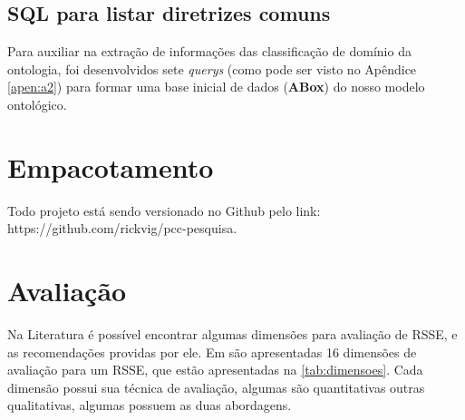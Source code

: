 \subsection{SQL para listar diretrizes comuns}
Para auxiliar na extração de informações das classificação de domínio da ontologia, foi desenvolvidos sete \textit{querys} (como pode ser visto no Apêndice \ref{apen:a2}) para formar uma base inicial de dados (\textbf{ABox}) do nosso modelo ontológico.


\section{Empacotamento}

Todo projeto está sendo versionado no Github pelo link: https://github.com/rickvig/pcc-pesquisa.


\section{Avaliação}
\label{sec:aval}
Na Literatura é possível encontrar algumas dimensões para avaliação de RSSE, e as recomendações providas por ele. Em \citet{robillard2010recommendation} são apresentadas 16 dimensões de avaliação para um RSSE, que estão apresentadas na \ref{tab:dimensoes}. Cada dimensão possui sua técnica de avaliação, algumas são quantitativas outras qualitativas, algumas possuem as duas abordagens.

